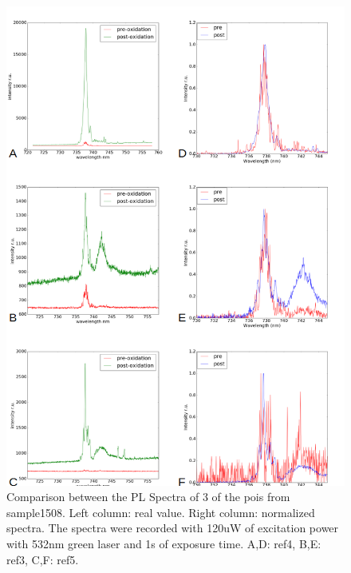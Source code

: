 \begin{figure}[h]
	\centering
	\includegraphics[width=1\linewidth]{Figures/pic/prepostoxidationspectra}
	\caption{Comparison between the PL Spectra of 3 of the pois from sample1508. Left column: real value. Right column: normalized spectra. The spectra were recorded with 120uW of excitation power with 532nm green laser and 1s of exposure time. A,D: ref4, B,E: ref3, C,F: ref5.}
	\label{fig:prepostoxidationspectra}
\end{figure}

